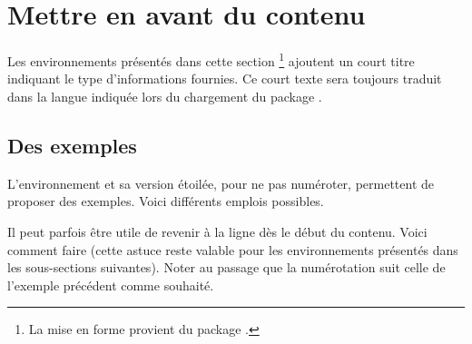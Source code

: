 

\usepackage[lang = french]{../main/main}
\usepackage{../macroenv/macroenv}
\usepackage{../showcase/showcase}
\usepackage{../listing/listing}
\usepackage{../inenglish/inenglish}


\usepackage{focus}




\section{Mettre en avant du contenu}

\begin{bdocinfo}
	Les environnements présentés dans cette section
	\footnote{
		La mise en forme provient du package .
	}
	ajoutent un court titre indiquant le type d'informations fournies.
	Ce court texte sera toujours traduit dans la langue indiquée lors du chargement du package .
\end{bdocinfo}	




\subsection{Des exemples}

L'environnement  et sa version étoilée, pour ne pas numéroter, permettent de proposer des exemples. Voici différents emplois possibles.





Il peut parfois être utile de revenir à la ligne dès le début du contenu. Voici comment faire (cette astuce reste valable pour les environnements présentés dans les sous-sections suivantes). Noter au passage que la numérotation suit celle de l'exemple précédent comme souhaité.








